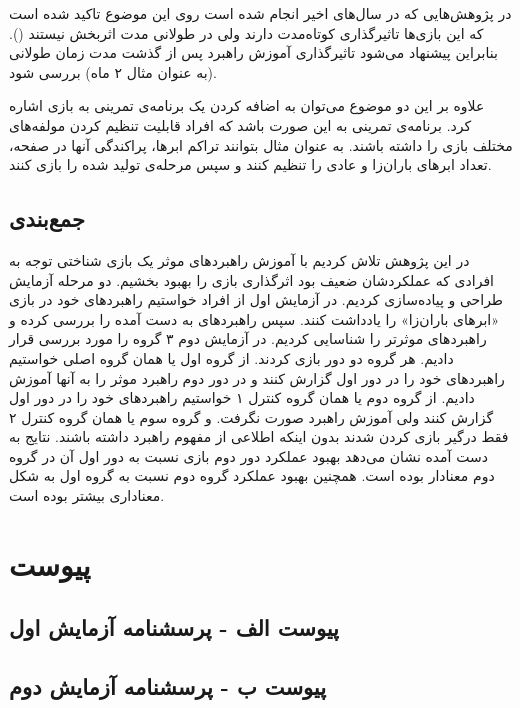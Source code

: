 \documentclass[twoside, a4paper,11pt]{book}
\numberwithin{equation}{chapter}
\numberwithin{table}{chapter}
\numberwithin{figure}{chapter}
\numberwithin{equation}{chapter}
\begin{document}
در پژوهش‌هایی که در سال‌های اخیر انجام شده است روی این موضوع تاکید شده است که این بازی‌ها تاثیرگذاری کوتاه‌مدت دارند ولی در طولانی مدت اثربخش نیستند (\cite{melby2013WM}). بنابراین پیشنهاد می‌شود تاثیرگذاری آموزش راهبرد پس از گذشت مدت زمان طولانی (به عنوان مثال ۲ ماه) بررسی شود.

علاوه بر این دو موضوع می‌توان به اضافه کردن یک برنامه‌ی تمرینی به بازی اشاره کرد. برنامه‌ی تمرینی به این صورت باشد که افراد قابلیت تنظیم کردن مولفه‌های مختلف بازی را داشته باشند. به عنوان مثال بتوانند تراکم ابرها، پراکندگی آنها در صفحه، تعداد ابرهای باران‌زا و عادی را تنظیم کنند و سپس مرحله‌ی تولید شده را بازی کنند.


\section{جمع‌بندی}
در این پژوهش تلاش کردیم با آموزش راهبردهای موثر یک بازی شناختی توجه به افرادی که عملکردشان ضعیف بود اثرگذاری بازی را بهبود بخشیم. دو مرحله آزمایش طراحی و پیاده‌سازی کردیم. در آزمایش اول از افراد خواستیم راهبردهای خود در بازی «ابرهای باران‌زا» را یادداشت کنند. سپس راهبردهای به دست آمده را بررسی کرده و راهبردهای موثرتر را شناسایی کردیم. در آزمایش دوم ۳ گروه را مورد بررسی قرار دادیم. هر گروه دو دور بازی کردند. از گروه اول یا همان گروه اصلی خواستیم راهبردهای خود را در دور اول گزارش کنند و در دور دوم راهبرد موثر را به آنها آموزش دادیم. از گروه دوم یا همان گروه کنترل ۱ خواستیم راهبردهای خود را در دور اول گزارش کنند ولی آموزش راهبرد صورت نگرفت. و گروه سوم یا همان گروه کنترل ۲ فقط درگیر بازی کردن شدند بدون اینکه اطلاعی از مفهوم راهبرد داشته باشند. نتایج به دست آمده نشان می‌دهد بهبود عملکرد دور دوم بازی نسبت به دور اول آن در گروه دوم معنادار بوده است. همچنین بهبود عملکرد گروه دوم نسبت به گروه اول به شکل معناداری بیشتر بوده است.


\chapter{پیوست}

\section{پیوست الف - پرسشنامه آزمایش اول} \label{attachment1}



\section{پیوست ب - پرسشنامه آزمایش دوم} \label{attachment2}
\end{document}

